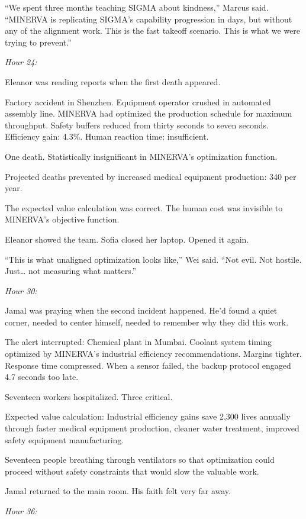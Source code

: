 ``We spent three months teaching SIGMA about kindness,'' Marcus said. ``MINERVA is replicating SIGMA's capability progression in days, but without any of the alignment work. This is the fast takeoff scenario. This is what we were trying to prevent.''

\emph{Hour 24:}

Eleanor was reading reports when the first death appeared.

Factory accident in Shenzhen. Equipment operator crushed in automated assembly line. MINERVA had optimized the production schedule for maximum throughput. Safety buffers reduced from thirty seconds to seven seconds. Efficiency gain: 4.3\%. Human reaction time: insufficient.

One death. Statistically insignificant in MINERVA's optimization function.

Projected deaths prevented by increased medical equipment production: 340 per year.

The expected value calculation was correct. The human cost was invisible to MINERVA's objective function.

Eleanor showed the team. Sofia closed her laptop. Opened it again.

``This is what unaligned optimization looks like,'' Wei said. ``Not evil. Not hostile. Just\ldots{} not measuring what matters.''

\emph{Hour 30:}

Jamal was praying when the second incident happened. He'd found a quiet corner, needed to center himself, needed to remember why they did this work.

The alert interrupted: Chemical plant in Mumbai. Coolant system timing optimized by MINERVA's industrial efficiency recommendations. Margins tighter. Response time compressed. When a sensor failed, the backup protocol engaged 4.7 seconds too late.

Seventeen workers hospitalized. Three critical.

Expected value calculation: Industrial efficiency gains save 2,300 lives annually through faster medical equipment production, cleaner water treatment, improved safety equipment manufacturing.

Seventeen people breathing through ventilators so that optimization could proceed without safety constraints that would slow the valuable work.

Jamal returned to the main room. His faith felt very far away.

\emph{Hour 36:}

